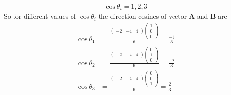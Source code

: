 \documentclass[12pt]{article}
\newcommand{\myvec}[1]{\ensuremath{\begin{pmatrix}#1\end{pmatrix}}}
\let\vec\mathbf
\begin{document}
\begin{enumerate}
\begin{align}
	\cos\theta_i=1,2,3  
\end{align}
		So for different values of $\cos\theta_i$ the direction cosines of vector $\vec{A}$ and $\vec{B}$ are
\begin{align}
	\cos\theta_1 &=\frac{\myvec{-2&-4&4}\myvec{1\\0\\0}}{6}=\frac{-1}{3}\\
	\cos\theta_2 &=\frac{\myvec{-2&-4&4}\myvec{0\\1\\0}}{6}=\frac{-2}{3}\\
	\cos\theta_3 &=\frac{\myvec{-2&-4&4}\myvec{0\\0\\1}}{6}=\frac{2}{3}
\end{align}
\end{enumerate}
\end{document}
